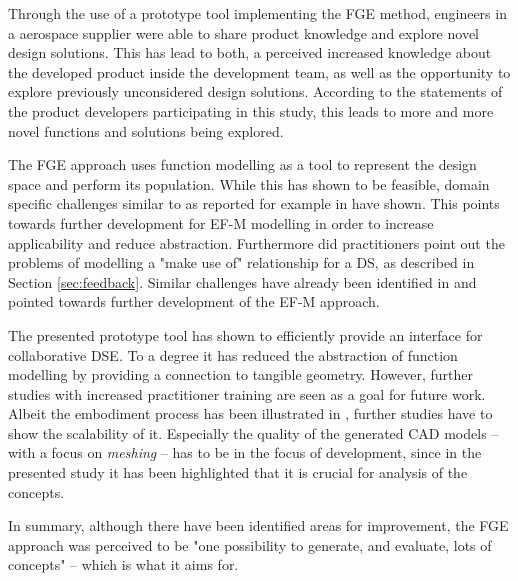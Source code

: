 \documentclass[aerospace,article,submit,moreauthors,pdftex]{Definitions/mdpi}
\begin{document}
Through the use of a prototype tool implementing the \ac{FGE} method, engineers in a aerospace supplier were able to share product knowledge and explore novel design solutions.
This has lead to both, a perceived increased knowledge about the developed product inside the development team, as well as the opportunity to explore previously unconsidered design solutions.
According to the statements of the product developers participating in this study, this leads to more and more novel functions and solutions being explored.


The \ac{FGE} approach uses function modelling as a tool to represent the design space and perform its population.
While this has shown to be feasible, domain specific challenges similar to as reported for example in \cite{Tomiyama2013} have shown.
This points towards further development for \ac{EF-M} modelling in order to increase applicability and reduce abstraction.
Furthermore did practitioners point out the problems of modelling a "make use of" relationship for a \ac{DS}, as described in Section \ref{sec:feedback}. Similar challenges have already been identified in \cite{Muller2020} and pointed towards further development of the \ac{EF-M} approach.

The presented prototype tool has shown to efficiently provide an interface for collaborative \ac{DSE}. 
To a degree it has reduced the abstraction of function modelling by providing a connection to tangible geometry. 
However, further studies with increased practitioner training are seen as a goal for future work.
Albeit the embodiment process has been illustrated in \cite{Muller2020a}, further studies have to show the scalability of it.
Especially the quality of the generated CAD models -- with a focus on \textit{meshing} -- has to be in the focus of development, since in the presented study it has been highlighted that it is crucial for analysis of the concepts.

In summary, although there have been identified areas for improvement, the \ac{FGE} approach was perceived to be "one possibility to generate, and evaluate, lots of concepts" -- which is what it aims for.
\end{document}
